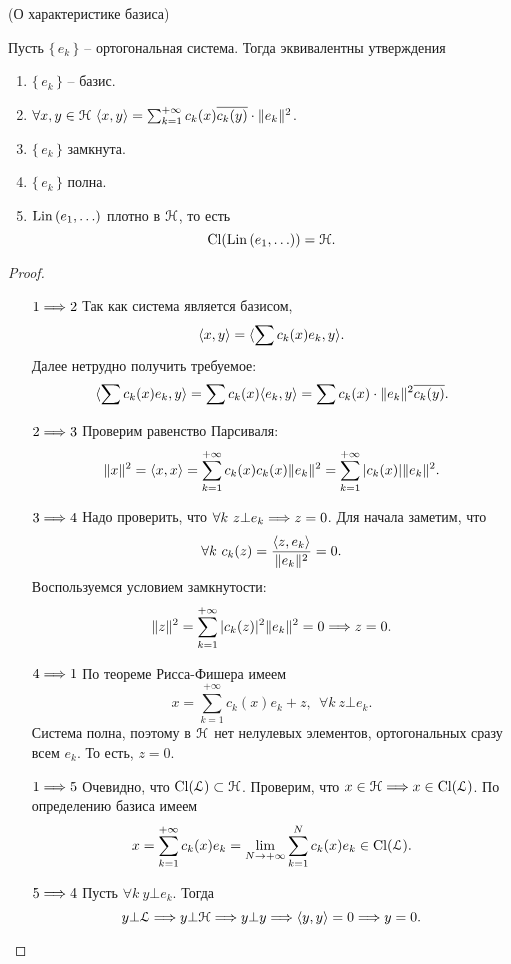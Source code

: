 \begin{theorem}(О характеристике базиса)
    
    Пусть $\{\,e_k\,\}$ -- ортогональная система. Тогда эквивалентны
    утверждения
    \begin{enumerate}
        \item $\{\,e_k\,\}$ -- базис.
        \item $\forall x, y \in \cH~ \scp{x}{y} = \sum_{k = 1}^{+\infty}{c_k(x)
            \overline{c_k(y)} \cdot \norm{e_k}^2}$.
        \item $\{\,e_k\,\}$ замкнута.
        \item $\{\,e_k\,\}$ полна.
        \item $\Lin{\parens*{e_1, \ldots}}$ плотно в $\cH$, то есть
            \[
                \Cl(\Lin{\parens*{e_1, \ldots}}) = \cH
            .\]
    \end{enumerate}
\end{theorem}
\begin{proof}
    \enewline
    \begin{itemize}
        \item[$1 \Lra 2$] Так как система является базисом,
            \[
                \scp{x}{y} = \scp{\sum{c_k(x) e_k}}{y}
            .\]
            Далее нетрудно получить требуемое:
            \[
                \scp{\sum{c_k(x) e_k}}{y} = \sum{c_k(x) \scp{e_k}{y}} =
                \sum{c_k(x) \cdot \norm{e_k}^2 \overline{c_k(y)}}
            .\]
        \item[$2 \Lra 3$] Проверим равенство Парсиваля:
            \[
                \norm{x}^2 = \scp{x}{x} = \sum_{k = 1}^{+\infty}{c_k(x) c_k(x) 
                \norm{e_k}^2} = \sum_{k = 1}^{+\infty}{|c_k(x)| \norm{e_k}^2}
            .\]
        \item[$3 \Lra 4$] Надо проверить, что $\forall k~ z \bot e_k \Lra z = 0$.
            Для начала заметим, что
            \[
                \forall k~ c_k(z) = \frac{\scp{z}{e_k}}{\norm{e_k}^2} = 0
            .\]
            Воспользуемся условием замкнутости:
            \[
                \norm{z}^2 = \sum_{k = 1}^{+\infty}{|c_k(z)|^2 \norm{e_k}^2} = 0
                \Lra z = 0
            .\]
        \item[$4 \Lra 1$] По теореме Рисса-Фишера имеем
            \[
                x = \sum_{k = 1}^{+\infty}{c_k(x) e_k} + z,~~ \forall k~ z \bot e_k
            .\]
            Система полна, поэтому в $\cH$ нет нелулевых элементов, ортогональных
            сразу всем $e_k$. То есть, $z = 0$.
        \item[$1 \Lra 5$] Очевидно, что $\Cl(\cL) \subset \cH$. Проверим, что
            $x \in \cH \Lra x \in \Cl(\cL)$. По определению базиса имеем
            \[
                x = \sum_{k = 1}^{+\infty}{c_k(x) e_k} = \lim_{N \to +\infty}
                {\sum_{k = 1}^N{c_k(x) e_k}} \in \Cl(\cL)
            .\]
        \item[$5 \Lra 4$] Пусть $\forall k~ y \bot e_k$. Тогда
            \[
                y \bot \cL \Lra y \bot \cH \Lra y \bot y \Lra \scp{y}{y} = 0 \Lra y = 0
            .\]
    \end{itemize}
\end{proof}

